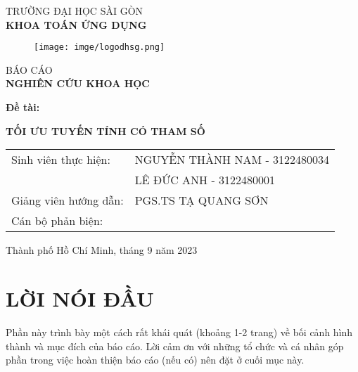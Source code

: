 \documentclass{article} %
\begin{document}
\begin{center}
\vspace{-15pt} TRƯỜNG ĐẠI HỌC SÀI GÒN\\
\textbf{\fontsize{16pt}{0pt}\selectfont KHOA TOÁN ỨNG DỤNG}
\vspace{0.5cm}
\begin{figure}[H]
    \centering
    \texttt{[image: imge/logodhsg.png]}
\end{figure}
\vspace{1.5cm}
\fontsize{24pt}{0pt}\selectfont BÁO CÁO\\
\vspace{12pt}
\textbf{\fontsize{32pt}{0pt}\selectfont NGHIÊN CỨU KHOA HỌC}
\vspace{1.5cm}
\end{center}
\hspace{20pt}\textbf{\fontsize{14pt}{0pt}\selectfont Đề tài:}
\begin{center}
\textbf{\fontsize{20pt}{0pt}\selectfont TỐI ƯU TUYẾN TÍNH CÓ THAM SỐ} 
\vspace{1cm}
\begin{table}[H]
    \centering
    \begin{tabular}{l l}
\fontsize{14pt}{0pt}\selectfont Sinh viên thực hiện:     & \fontsize{14pt}{0pt}\selectfont NGUYỄN THÀNH NAM - 3122480034 \vspace{6pt}\\     
  & \fontsize{14pt}{0pt}\selectfont LÊ ĐỨC ANH - 3122480001 \vspace{6pt}\\
\fontsize{14pt}{0pt}\selectfont Giảng viên hướng dẫn: & \fontsize{14pt}{0pt}\selectfont PGS.TS TẠ QUANG SƠN \vspace{6pt}\\
Cán bộ phản biện: & 
\end{tabular}
\end{table}
\vspace{0.5cm}
\fontsize{14pt}{0pt}\selectfont Thành phố Hồ Chí Minh, tháng 9 năm 2023
\end{center}
\cleardoublepage
\section*{LỜI NÓI ĐẦU}
\thispagestyle{empty}
Phần này trình bày một cách rất khái quát (khoảng 1-2 trang) về bối cảnh hình thành và mục đích của báo cáo. Lời cảm ơn với những tổ chức và cá nhân góp phần trong việc hoàn thiện báo cáo (nếu có) nên đặt ở cuối mục này.
\cleardoublepage
\end{document}
